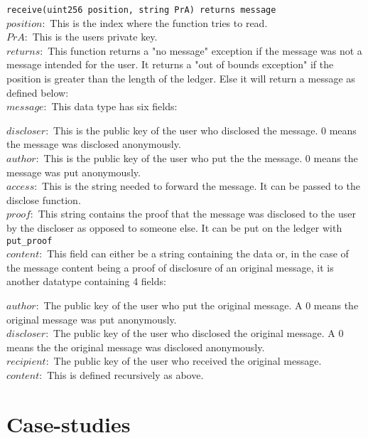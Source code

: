 \documentclass[a4paper]{article} %
\begin{document}
\noindent\lstinline{receive(uint256 position, string PrA) returns message}\\
$position :$ This is the index where the function tries to read. \\
$PrA :$ This is the users private key.\\
$returns :$ This function returns a "no message" exception if the message was not a message intended for the user. It returns a "out of bounds exception" if the position is greater than the length of the ledger. Else it will return a message as defined below: \\
$message :$ This data type has six fields:\\
\begin{adjustwidth}{.5cm}{}
$discloser :$ This is the public key of the user who disclosed the message. 0 means the message was disclosed anonymously. \\
$author :$ This is the public key of the user who put the the message. 0 means the message was put anonymously. \\
$access: $ This is the string needed to forward the message. It can be passed to the disclose function.\\
$proof: $ This string contains the proof that the message was disclosed to the user by the discloser as opposed to someone else. It can be put on the ledger with \lstinline{put_proof} \\
$content: $ This field can either be a string containing the data or, in the case of the message content being a proof of disclosure of an original message, it is another datatype containing 4 fields: \\
\begin{adjustwidth}{.5cm}{}
$author: $ The public key of the user who put the original message. A 0 means the original message was put anonymously. \\
$discloser: $ The public key of the user who disclosed the original message. A 0 means the the original message was disclosed anonymously. \\
$recipient: $ The public key of the user who received the original message. \\
$content: $ This is defined recursively as above. \\
\end{adjustwidth}
\end{adjustwidth}

\newpage
\section{Case-studies}
\end{document}
